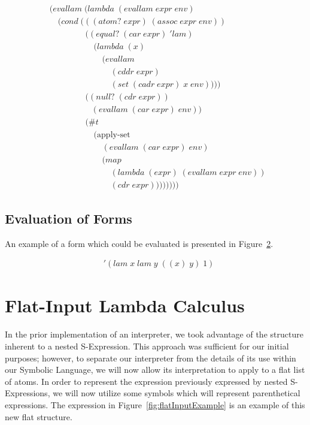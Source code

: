 \begin{figure}[htp]
\caption{}\label{fig:evallamDef}
\begin{align*}
& (evallam \; (lambda \; (evallam \; expr \; env)
\\& \quad (cond \; (((atom? \; expr) \; (assoc \; expr \; env))
\\& \qquad \qquad \; ((equal? \; (car \; expr) \; 'lam) \; 
\\& \qquad \qquad \quad \; (lambda \; (x) \; 
\\& \qquad \qquad \qquad \; (evallam \; 
\\& \qquad \qquad \qquad \quad \; (cddr \; expr) \; 
\\& \qquad \qquad \qquad \quad \; (set \; (cadr \; expr) \; x \; env))))
\\& \qquad \qquad \; ((null? \; (cdr \; expr)) \; 
\\& \qquad \qquad \quad (evallam \; (car \; expr) \; env))
\\& \qquad \qquad \; (\#t \; 
\\& \qquad \qquad \quad \; (\text{apply-set} \; 
\\& \qquad \qquad \qquad \; (evallam \; (car \; expr) \; env) \; 
\\& \qquad \qquad \qquad \; (map \; 
\\& \qquad \qquad \qquad \quad \; (lambda \; (expr) \; (evallam \; expr \; env)) \; 
\\& \qquad \qquad \qquad \quad \; (cdr \; expr))))))))
\end{align*}
\end{figure}

\subsection{Evaluation of Forms}
An example of a form which could be evaluated is presented in Figure~\ref{fig:evalFormExample}. 

\begin{figure}[htp]
\caption{}\label{fig:evalFormExample}
\begin{align*}
& '(lam \; x \; lam \; y \; ((x) \; y) \; 1)
\end{align*}
\end{figure}

\section{Flat-Input Lambda Calculus }
In the prior implementation of an interpreter, we took advantage of the
structure inherent to a nested S-Expression. This approach was sufficient for
our initial purposes; however, to separate our interpreter from the details of
its use within our Symbolic Language, we will now allow its interpretation to
apply to a flat list of atoms.  In order to represent the expression previously
expressed by nested S-Expressions, we will now utilize some symbols which will
represent parenthetical expressions.  The expression in
Figure~\ref{fig:flatInputExample} is an example of this new flat structure.

